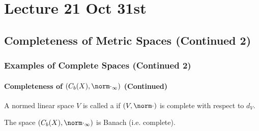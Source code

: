 \documentclass[notoc,notitlepage]{tufte-book}
\begin{document}



\chapter{Lecture 21 Oct 31st}%
\label{chp:lecture_21_oct_31st}

\section{Completeness of Metric Spaces (Continued 2)}%
\label{sec:completeness_of_metric_spaces_continued_2}

\subsection{Examples of Complete Spaces (Continued 2)}%
\label{sub:examples_of_complete_spaces_continued_2}

\subsubsection{Completeness of $(C_b(X), \norm\cdot_\infty)$ (Continued)}%
\label{ssub:completeness_of_c_b_x_norm_cdot_infty_continued}

\begin{note}
  A normed linear space $V$ is called a   if $(V, \norm\cdot)$ is complete with respect to $d_V$.
\end{note}

\begin{thm}\label{thm:completeness_for_c_b_x_}
  The space $(C_b(X), \norm\cdot_\infty)$ is Banach (i.e. complete).
\end{thm}
\end{document}
